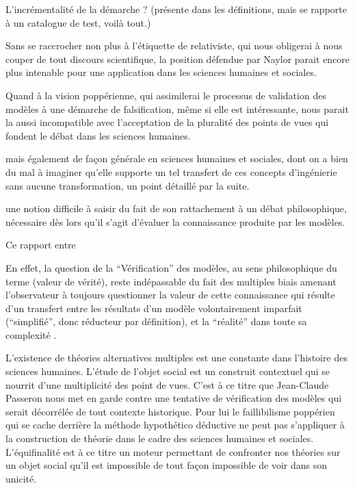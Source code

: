 L'incrémentalité de la démarche ? (présente dans les définitions, mais se rapporte à un catalogue de test, voilà tout.)

Sans se raccrocher non plus à l'étiquette de relativiste, qui nous obligerai à nous couper de tout discours scientifique, la position défendue par Naylor parait encore plus intenable pour une application dans les sciences humaines et sociales.

Quand à la vision poppérienne, qui assimilerai le processus de validation des modèles à une démarche de falsification, même si elle est intéressante, nous parait la aussi incompatible avec l'acceptation de la pluralité des points de vues qui fondent le débat dans les sciences humaines.


mais également de façon générale en sciences humaines et sociales, dont on a bien du mal à imaginer qu'elle supporte un tel transfert de ces concepts d’ingénierie sans aucune transformation, un point détaillé par la suite.




une notion difficile à saisir du fait de son rattachement à un débat philosophique, nécessaire dès lors qu'il s'agit d'évaluer la connaissance produite par les modèles.

Ce rapport entre  

En effet, la question de la \enquote{Vérification} des modèles, au sens philosophique du terme (valeur de vérité), reste indépassable du fait des multiples biais amenant l'observateur à toujours questionner la valeur de cette connaissance qui résulte d'un transfert entre les résultats d'un modèle volontairement imparfait (\enquote{simplifié}, donc réducteur par définition), et la \enquote{réalité} dans toute sa complexité \autocite{OSullivan2004}.

L’existence de théories alternatives multiples est une constante dans l’histoire des sciences humaines. L'étude de l'objet social est un construit contextuel qui se nourrit d'une multiplicité des point de vues. C'est à ce titre que Jean-Claude Passeron \autocite{Passeron2006} nous met en garde contre une tentative de vérification des modèles qui serait décorrélée de tout contexte historique. Pour lui le faillibilisme poppérien qui se cache derrière la méthode hypothético déductive ne peut pas s'appliquer à la construction de théorie dans le cadre des sciences humaines et sociales. L'équifinalité est à ce titre un moteur permettant de confronter nos théories sur un objet social  qu'il est impossible de tout façon impossible de voir dans son unicité. 

